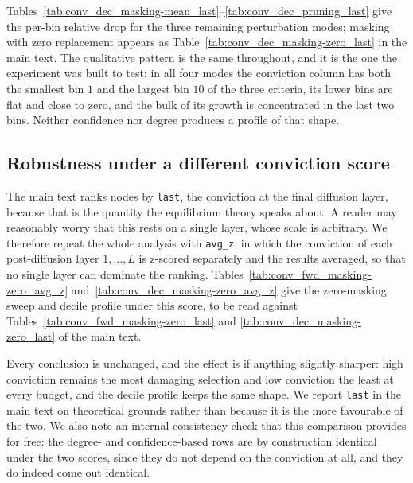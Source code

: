 Tables~\ref{tab:conv_dec_masking-mean_last}--\ref{tab:conv_dec_pruning_last}
give the per-bin relative drop for the three remaining perturbation modes;
masking with zero replacement appears as
Table~\ref{tab:conv_dec_masking-zero_last} in the main text. The qualitative
pattern is the same throughout, and it is the one the experiment was built to
test: in all four modes the conviction column has both the smallest bin $1$ and
the largest bin $10$ of the three criteria, its lower bins are flat and close to
zero, and the bulk of its growth is concentrated in the last two bins. Neither
confidence nor degree produces a profile of that shape.







\subsection{Robustness under a different conviction score}
\label{sec:supp_robust}

The main text ranks nodes by \texttt{last}, the conviction at the final
diffusion layer, because that is the quantity the equilibrium theory speaks
about. A reader may reasonably worry that this rests on a single layer, whose
scale is arbitrary. We therefore repeat the whole analysis with \texttt{avg\_z},
in which the conviction of each post-diffusion layer $1,\dots,L$ is z-scored
separately and the results averaged, so that no single layer can dominate the
ranking. Tables~\ref{tab:conv_fwd_masking-zero_avg_z}
and~\ref{tab:conv_dec_masking-zero_avg_z} give the zero-masking sweep and decile
profile under this score, to be read against
Tables~\ref{tab:conv_fwd_masking-zero_last} and
\ref{tab:conv_dec_masking-zero_last} of the main text.

Every conclusion is unchanged, and the effect is if anything slightly sharper:
high conviction remains the most damaging selection and low conviction the least
at every budget, and the decile profile keeps the same shape. We report
\texttt{last} in the main text on theoretical grounds rather than because it is
the more favourable of the two. We also note an internal consistency check that
this comparison provides for free: the degree- and confidence-based rows are by
construction identical under the two scores, since they do not depend on the
conviction at all, and they do indeed come out identical.

